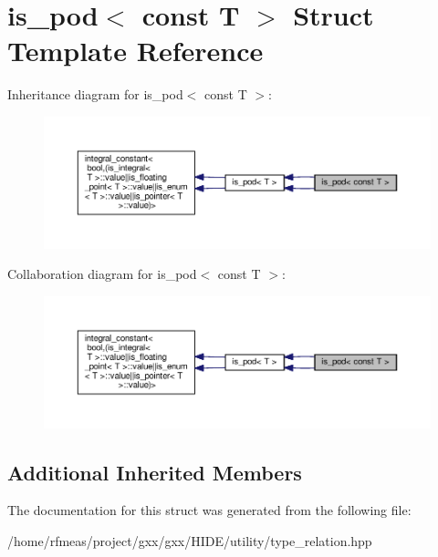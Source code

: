 \hypertarget{structis__pod_3_01const_01T_01_4}{}\section{is\+\_\+pod$<$ const T $>$ Struct Template Reference}
\label{structis__pod_3_01const_01T_01_4}


Inheritance diagram for is\+\_\+pod$<$ const T $>$\+:
\nopagebreak
\begin{figure}[H]
\begin{center}
\leavevmode
\includegraphics[width=350pt]{structis__pod_3_01const_01T_01_4__inherit__graph}
\end{center}
\end{figure}


Collaboration diagram for is\+\_\+pod$<$ const T $>$\+:
\nopagebreak
\begin{figure}[H]
\begin{center}
\leavevmode
\includegraphics[width=350pt]{structis__pod_3_01const_01T_01_4__coll__graph}
\end{center}
\end{figure}
\subsection*{Additional Inherited Members}


The documentation for this struct was generated from the following file\+:\begin{DoxyCompactItemize}
\item 
/home/rfmeas/project/gxx/gxx/\+H\+I\+D\+E/utility/type\+\_\+relation.\+hpp\end{DoxyCompactItemize}
